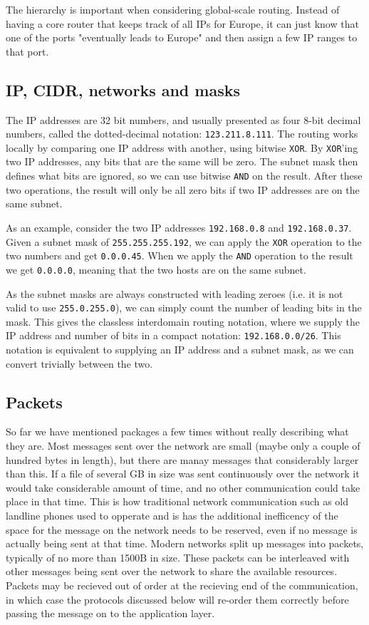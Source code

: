 The hierarchy is important when considering global-scale routing. Instead of having a core router that keeps track of all IPs for Europe, it can just know that one of the ports "eventually leads to Europe" and then assign a few IP ranges to that port.

\subsection{IP, CIDR, networks and masks}
The IP addresses are 32 bit numbers, and usually presented as four 8-bit decimal numbers, called the dotted-decimal notation: \texttt{123.211.8.111}. The routing works locally by comparing one IP address with another, using bitwise \texttt{XOR}. By \texttt{XOR}'ing two IP addresses, any bits that are the same will be zero. The subnet mask then defines what bits are ignored, so we can use bitwise \texttt{AND} on the result. After these two operations, the result will only be all zero bits if two IP addresses are on the same subnet.

As an example, consider the two IP addresses \texttt{192.168.0.8} and \texttt{192.168.0.37}. Given a subnet mask of \texttt{255.255.255.192}, we can apply the \texttt{XOR} operation to the two numbers and get \texttt{0.0.0.45}. When we apply the \texttt{AND} operation to the result we get \texttt{0.0.0.0}, meaning that the two hosts are on the same subnet.

As the subnet masks are always constructed with leading zeroes (i.e. it is not valid to use \texttt{255.0.255.0}), we can simply count the number of leading bits in the mask. This gives the classless interdomain routing notation, where we supply the IP address and number of bits in a compact notation: \texttt{192.168.0.0/26}. This notation is equivalent to supplying an IP address and a subnet mask, as we can convert trivially between the two.

\subsection{Packets}
So far we have mentioned packages a few times without really describing what they are. Most messages sent over the network are small (maybe only a couple of hundred bytes in length), but there are manay messages that considerably larger than this. If a file of several GB in size was sent continuously over the network it would take considerable amount of time, and no other communication could take place in that time. This is how traditional network communication such as old landline phones used to opperate and is has the additional inefficency of the space for the message on the network needs to be reserved, even if no message is actually being sent at that time. Modern networks split up messages into packets, typically of no more than 1500B in size. These packets can be interleaved with other messages being sent over the network to share the available resources. Packets may be recieved out of order at the recieving end of the communication, in which case the protocols discussed below will re-order them correctly before passing the message on to the application layer.

